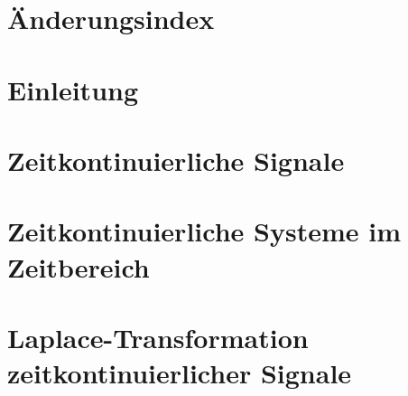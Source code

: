 

\thispagestyle{empty} %

\newpage

\thispagestyle{empty}
\section*{Änderungsindex}

\newpage

\thispagestyle{empty}
\thispagestyle{empty}
\tableofcontents

\newpage

\thispagestyle{empty} %
\mbox{}


\section{Einleitung}


\clearpage

\section{Zeitkontinuierliche Signale}


\clearpage

\section{Zeitkontinuierliche Systeme im Zeitbereich}


\clearpage

\section{Laplace-Transformation zeitkontinuierlicher Signale}



